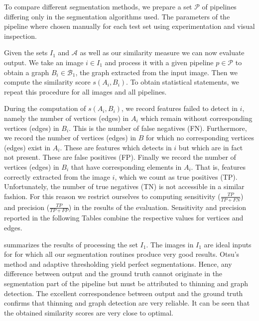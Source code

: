 		To compare different segmentation methods, we prepare a set $\mathcal{P}$ of pipelines differing only in the segmentation algorithms used. The parameters of the pipeline where chosen manually for each test set using experimentation and visual inspection.

		Given the sets $I_1$ and $\mathcal{A}$ as well as our similarity measure we can now evaluate \NEFIs output. We take an image $i \in I_1$ and process it with a given pipeline $p \in \mathcal{P}$ to obtain a graph $B_i \in \mathcal{B}_1$, \ie the graph \NEFI extracted from the input image. Then we compute the similarity score $s(A_i, B_i)$. To obtain statistical statements, we repeat this procedure for all images and all pipelines.

		During the computation of $s(A_i, B_i)$, we record features \NEFI failed to detect in $i$, namely the number of vertices (edges) in $A_i$ which remain without corresponding vertices (edges) in $B_i$. This is the number of false negatives (FN). Furthermore, we record the number of vertices (edges) in $B$ for which no corresponding vertices (edges) exist in $A_i$. These are features which \NEFI detects in $i$ but which are in fact not present. These are false positives (FP). Finally we record the number of vertices (edges) in $B_i$ that have corresponding elements in $A_i$. That is, features correctly extracted from the image $i$, which we count as true positives (TP). Unfortunately, the number of true negatives (TN) is not accessible in a similar fashion. For this reason we restrict ourselves to computing sensitivity ($\tfrac{TP}{TP + FN}$) and precision ($\tfrac{TP}{TP + FP}$) in the results of the evaluation. Sensitivity and precision reported in the following Tables combine the respective values for vertices and edges. 

		 summarizes the results of processing the set $I_1$. The images in $I_1$ are ideal inputs for \NEFI for which all our segmentation routines produce very good results. Otsu's method and adaptive thresholding yield perfect segmentations. Hence, any difference between \NEFIs output and the ground truth cannot originate in the segmentation part of the pipeline but must be attributed to thinning and graph detection. The excellent correspondence between \NEFIs output and the ground truth confirms that thinning and graph detection are very reliable. It can be seen that the obtained similarity scores are very close to optimal.

